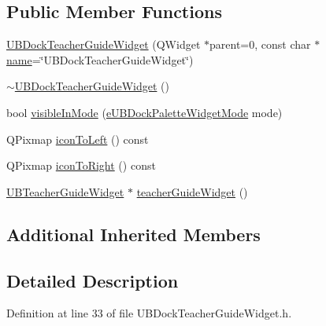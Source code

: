 \subsection*{Public Member Functions}
\begin{DoxyCompactItemize}
\item 
\hyperlink{class_u_b_dock_teacher_guide_widget_a02b9d42d9b4cba43bed5a88b41150cca}{U\-B\-Dock\-Teacher\-Guide\-Widget} (Q\-Widget $\ast$parent=0, const char $\ast$\hyperlink{class_u_b_dock_palette_widget_a1c7779c0584c0d2541b4c05acc1ffbbb}{name}=\char`\"{}U\-B\-Dock\-Teacher\-Guide\-Widget\char`\"{})
\item 
\hyperlink{class_u_b_dock_teacher_guide_widget_a07307d312409895114807341c7c6fc88}{$\sim$\-U\-B\-Dock\-Teacher\-Guide\-Widget} ()
\item 
bool \hyperlink{class_u_b_dock_teacher_guide_widget_a5f322982c484e7fa20696eb9b10a567e}{visible\-In\-Mode} (\hyperlink{_u_b_dock_palette_widget_8h_af3b2828ed1bf91ad13c73e4e1b3b529e}{e\-U\-B\-Dock\-Palette\-Widget\-Mode} mode)
\item 
Q\-Pixmap \hyperlink{class_u_b_dock_teacher_guide_widget_a2b04bcafd400a4d02343e043469f7b83}{icon\-To\-Left} () const 
\item 
Q\-Pixmap \hyperlink{class_u_b_dock_teacher_guide_widget_aafeef05289620980be10e63b600715fc}{icon\-To\-Right} () const 
\item 
\hyperlink{class_u_b_teacher_guide_widget}{U\-B\-Teacher\-Guide\-Widget} $\ast$ \hyperlink{class_u_b_dock_teacher_guide_widget_ac1f1d73be89ff66f9f83dc7472a0c203}{teacher\-Guide\-Widget} ()
\end{DoxyCompactItemize}
\subsection*{Additional Inherited Members}


\subsection{Detailed Description}


Definition at line 33 of file U\-B\-Dock\-Teacher\-Guide\-Widget.\-h.



